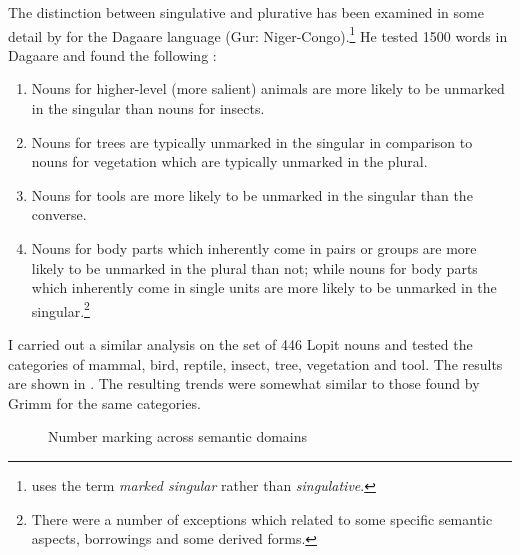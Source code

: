 \documentclass[output=paper]{langsci/langscibook}
\begin{document}
The distinction between singulative and plurative has been examined in some detail by \citet{Grimm2012} for the Dagaare language (Gur: Niger-Congo).\footnote{ \citet{Grimm2012} uses the term \textit{marked singular} rather than \textit{singulative}.} He tested 1500 words in Dagaare and found the following \citep[50]{Grimm2012}:

\begin{enumerate}[label=\roman*.]
\item Nouns for higher-level (more salient) animals are more likely to be unmarked in the singular than nouns for insects. 
\item Nouns for trees are typically unmarked in the singular in comparison to nouns for vegetation which are typically unmarked in the plural. 
\item Nouns for tools are more likely to be unmarked in the singular than the converse. 
\item Nouns for body parts which inherently come in pairs or groups are more likely to be unmarked in the plural than not; while nouns for body parts which inherently come in single units are more likely to be unmarked in the singular.\footnote{There were a number of exceptions which related to some specific semantic aspects, borrowings and some derived forms.}
\end{enumerate}

I carried out a similar analysis on the set of 446 Lopit nouns and tested the categories of mammal, bird, reptile, insect, tree, vegetation and tool. The results are shown in . The resulting trends were somewhat similar to those found by Grimm for the same categories. 

\begin{figure}
\caption{Number marking across semantic domains}
\label{fig:moodie:1}
\end{figure}
\end{document}
